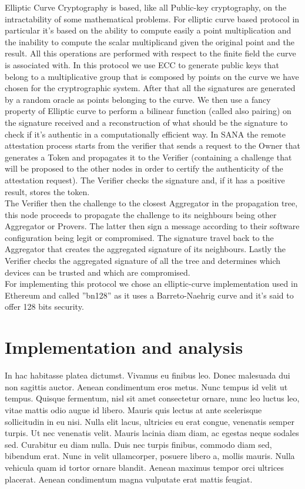 \documentclass[10pt, a4paper, twocolumn]{article} %
\begin{document}
Elliptic Curve Cryptography is based, like all Public-key cryptography, on the intractability of some mathematical problems.
For elliptic curve based protocol in particular it's based on the ability to compute easily a point multiplication and the inability to compute the scalar multiplicand given the original point and the result.
All this operations are performed with respect to the finite field the curve is associated with.
In this protocol we use ECC to generate public keys that belong to a multiplicative group that is composed by points on the curve we have chosen for the cryptrographic system.
After that all the signatures are generated by a random oracle as points belonging to the curve. We then use a fancy property of Elliptic curve to perform a bilinear function (called also pairing) on the signature received and a reconstruction of what should be the signature to check if it's authentic in a computationally efficient way.
In SANA the remote attestation process starts from the verifier that sends a request to the Owner that generates a Token and propagates it to the Verifier (containing a challenge that will be proposed to the other nodes in order to certify the authenticity of the attestation request). The Verifier checks the signature and, if it has a positive result, stores the token. \\The Verifier then
the challenge to the closest Aggregator in the propagation tree, this node proceeds to propagate the challenge to its neighbours being other Aggregator
or Provers. The latter then sign a message according to their software configuration being legit or compromised. The signature travel back to the Aggregator
that creates the aggregated signature of its neighbours. Lastly the Verifier checks the aggregated signature of all the tree and determines which devices
can be trusted and which are compromised.\\
For implementing this protocol we chose an elliptic-curve implementation used in Ethereum and called ''bn128'' as it uses a Barreto-Naehrig curve and it's said to offer 128 bits security.


\section{Implementation and analysis}

In hac habitasse platea dictumst. Vivamus eu finibus leo. Donec malesuada dui non sagittis auctor. Aenean condimentum eros metus. Nunc tempus id velit ut tempus. Quisque fermentum, nisl sit amet consectetur ornare, nunc leo luctus leo, vitae mattis odio augue id libero. Mauris quis lectus at ante scelerisque sollicitudin in eu nisi. Nulla elit lacus, ultricies eu erat congue, venenatis semper turpis. Ut nec venenatis velit. Mauris lacinia diam diam, ac egestas neque sodales sed. Curabitur eu diam nulla. Duis nec turpis finibus, commodo diam sed, bibendum erat. Nunc in velit ullamcorper, posuere libero a, mollis mauris. Nulla vehicula quam id tortor ornare blandit. Aenean maximus tempor orci ultrices placerat. Aenean condimentum magna vulputate erat mattis feugiat.
\end{document}
